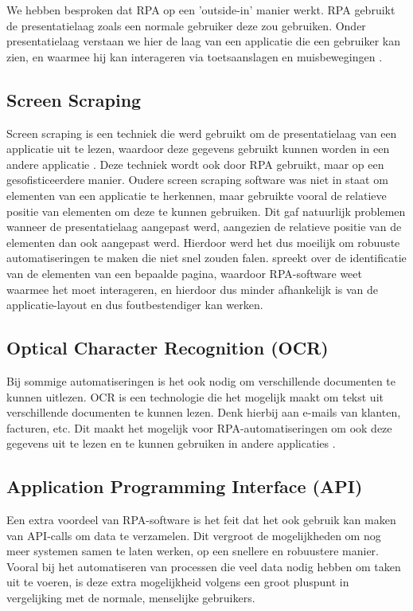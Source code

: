 We hebben besproken dat RPA op een 'outside-in' manier werkt. RPA gebruikt de presentatielaag zoals een normale gebruiker deze zou gebruiken. Onder presentatielaag verstaan we hier de laag van een applicatie die een gebruiker kan zien, en waarmee hij kan interageren via toetsaanslagen en muisbewegingen \autocite{ZalewskaTurzynska2022}.

\subsection{Screen Scraping}

Screen scraping is een techniek die werd gebruikt om de presentatielaag van een applicatie uit te lezen, waardoor deze gegevens gebruikt kunnen worden in een andere applicatie \autocite{Spencer2018}. Deze techniek wordt ook door RPA gebruikt, maar op een gesofisticeerdere manier. Oudere screen scraping software was niet in staat om elementen van een applicatie te herkennen, maar gebruikte vooral de relatieve positie van elementen om deze te kunnen gebruiken. 
Dit gaf natuurlijk problemen wanneer de presentatielaag aangepast werd, aangezien de relatieve positie van de elementen dan ook aangepast werd. Hierdoor werd het dus moeilijk om robuuste automatiseringen te maken die niet snel zouden falen. \textcite{Asquith2019} spreekt over de identificatie van de elementen van een bepaalde pagina, waardoor RPA-software weet waarmee het moet interageren, en hierdoor dus minder afhankelijk is van de applicatie-layout en dus foutbestendiger kan werken.

\subsection{Optical Character Recognition (OCR)}

Bij sommige automatiseringen is het ook nodig om verschillende documenten te kunnen uitlezen. OCR is een technologie die het mogelijk maakt om tekst uit verschillende documenten te kunnen lezen. Denk hierbij aan e-mails van klanten, facturen, etc. Dit maakt het mogelijk voor RPA-automatiseringen om ook deze gegevens uit te lezen en te kunnen gebruiken in andere applicaties \autocite{ZalewskaTurzynska2022}.

\subsection{Application Programming Interface (API)}

Een extra voordeel van RPA-software is het feit dat het ook gebruik kan maken van API-calls om data te verzamelen. Dit vergroot de mogelijkheden om nog meer systemen samen te laten werken, op een snellere en robuustere manier. Vooral bij het automatiseren van processen die veel data nodig hebben om taken uit te voeren, is deze extra mogelijkheid volgens \textcite{Hofmann2020} een groot pluspunt in vergelijking met de normale, menselijke gebruikers.


